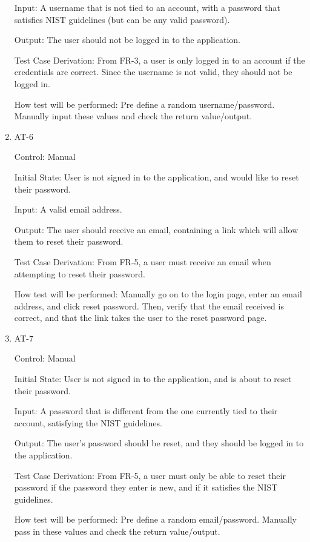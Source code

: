 \documentclass[12pt, titlepage]{article}
\begin{document}
\begin{enumerate}
Input: A username that is not tied to an account, with a password that satisfies NIST guidelines (but can be any valid password).
					
Output: The user should not be logged in to the application.

Test Case Derivation: From FR-3, a user is only logged in to an account if the credentials are correct. Since the username is not valid,
they should not be logged in.

How test will be performed: Pre define a random username/password. Manually input these values and check the return value/output.

\item{AT-6\\}

Control: Manual
					
Initial State: User is not signed in to the application, and would like to reset their password.
					
Input: A valid email address.
					
Output: The user should receive an email, containing a link which will allow them to reset their password.

Test Case Derivation: From FR-5, a user must receive an email when attempting to reset their password.

How test will be performed: Manually go on to the login page, enter an email address, and click reset password. Then, verify
that the email received is correct, and that the link takes the user to the reset password page.


\item{AT-7\\}

Control: Manual
					
Initial State: User is not signed in to the application, and is about to reset their password.
					
Input: A password that is different from the one currently tied to their account, satisfying the NIST guidelines.
					
Output: The user's password should be reset, and they should be logged in to the application.

Test Case Derivation: From FR-5, a user must only be able to reset their password if the password they enter is new, and if it 
satisfies the NIST guidelines.

How test will be performed: Pre define a random email/password. Manually pass in these values and check the return value/output.


\end{enumerate}
\end{document}

